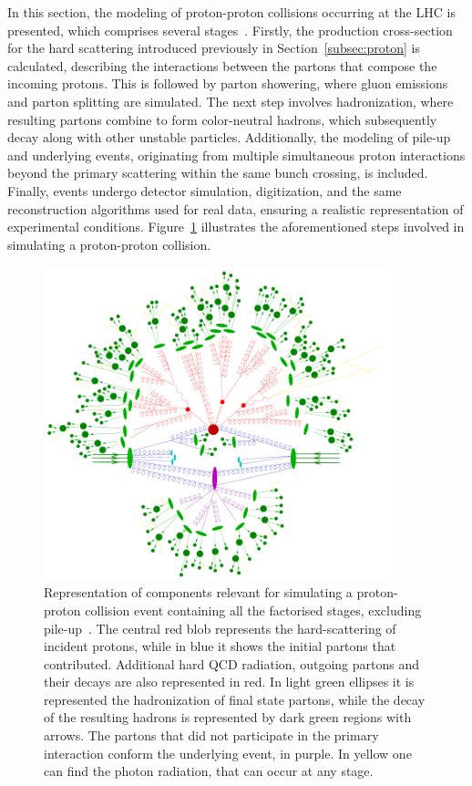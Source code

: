 In this section, the modeling of proton-proton collisions occurring at the LHC is presented, which comprises several stages~\cite{BUCKLEY2011145}.
Firstly, the production cross-section for the hard scattering introduced previously in Section~\ref{subsec:proton} is calculated, describing the interactions between the partons that compose the incoming protons.
This is followed by parton showering, where gluon emissions and parton splitting are simulated. The next step involves hadronization, where resulting partons combine to form color-neutral hadrons, which subsequently decay along with other unstable particles. Additionally, the modeling of pile-up and underlying events, originating from multiple simultaneous proton interactions beyond the primary scattering within the same bunch crossing, is included.
Finally, events undergo detector simulation, digitization, and the same reconstruction algorithms used for real data, ensuring a realistic representation of experimental conditions.
Figure~\ref{fig:pdfs} illustrates the aforementioned steps involved in simulating a proton-proton collision.
\begin{figure}[htbp]
    \centering
    \includegraphics[width=0.9\textwidth]{images/atlas_pp_sim.png}
    \caption{Representation of components relevant for simulating a proton-proton collision event containing all the factorised stages, excluding pile-up~\cite{Gleisberg_2009}. The central red blob represents the hard-scattering of incident protons,
    while in blue it shows the initial partons that contributed. Additional hard QCD radiation, outgoing partons and their decays are also represented in red. In light green ellipses it is represented the hadronization of final state partons, while the decay
    of the resulting hadrons is represented by dark green regions with arrows. The partons that did not participate in the primary interaction conform the underlying event, in purple. In yellow one can find the photon radiation, that can occur at any stage.}
    \label{fig:pdfs}
  \end{figure}

